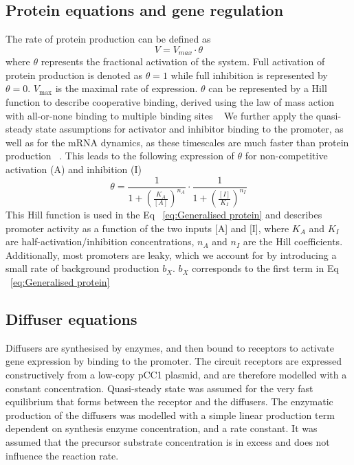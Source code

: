 \subsection{Protein equations and gene regulation}
The rate of protein production can be defined as
\begin{equation}
    V = V_{max} \cdot \theta
\end{equation}
where $\theta$ represents the fractional activation of the system. Full activation of protein production is denoted as $\theta=1$ while full inhibition is represented by $\theta=0$.
$V_{\max}$ is the maximal rate of expression.
$\theta$ can be represented by a Hill function to describe cooperative binding, derived using the law of mass action with all-or-none binding to multiple binding sites ~\parencite{Weiss1997}
We further apply the quasi-steady state assumptions for activator and inhibitor binding to the promoter, as well as for the mRNA dynamics, as these timescales are much faster than protein production ~\parencite{Andersen1998, Bremer2008}.
This leads to the following expression of $\theta$ for non-competitive activation (A) and inhibition (I)
\begin{equation}\label{eq:\theta}
    \theta  = \frac{1}{1+\left(\frac{K_{A}}{[A]}\right)^{n_{A}}} \cdot \frac{1}{1+\left(\frac{[I]}{K_{I}}\right)^{n_{I}}}
\end{equation}
This Hill function is used in the Eq ~\eqref{eq:Generalised protein} and describes promoter activity as a function of the two inputs [A] and [I], where $K_{A}$ and $K_{I}$ are half-activation/inhibition concentrations, $n_{A}$ and $n_{I}$ are the Hill coefficients.
Additionally, most promoters are leaky, which we account for by introducing a small rate of background production $b_{X}$. $b_{X}$ corresponds to the first term in Eq ~\eqref{eq:Generalised protein}
\subsection{Diffuser equations}
Diffusers are synthesised by enzymes, and then bound to receptors to activate gene expression by binding to the promoter. %
The circuit receptors are expressed constructively from a low-copy pCC1 plasmid, and are therefore modelled with a constant concentration.
Quasi-steady state was assumed for the very fast equilibrium that forms between the receptor and the diffusers. %
The enzymatic production of the diffusers was modelled with a simple linear production term dependent on synthesis enzyme concentration, and a rate constant.
It was assumed that the precursor substrate concentration is in excess and does not influence the reaction rate.
